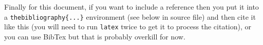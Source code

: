 \documentclass[a4wide, 10pt]{article}
\begin{document}
Finally for this document, if you want to include a reference
then you put it into a \texttt{thebibliography\{...\}}
environment (see below in source file) and then 
cite it like this \cite{lamport94}
(you will need to run \texttt{latex} twice to get it to process the citation),
or you can use BibTex but that is probably overkill for now.

\end{document}
